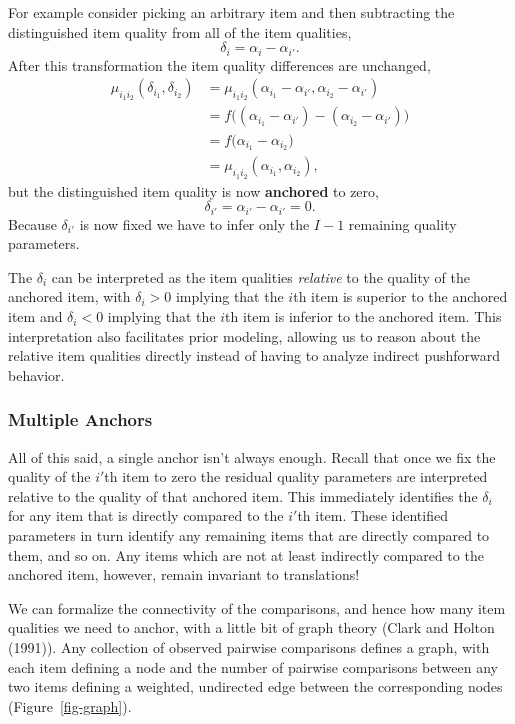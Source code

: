 \documentclass[
  letterpaper,
  DIV=11,
  numbers=noendperiod]{scrartcl}
\begin{document}
For example consider picking an arbitrary item and then subtracting the
distinguished item quality from all of the item qualities, \[
\delta_{i} = \alpha_{i} - \alpha_{i'}.
\] After this transformation the item quality differences are unchanged,
\begin{align*}
\mu_{i_{1} i_{2}}( \delta_{i_{1}}, \delta_{i_{2}} )
&=
\mu_{i_{1} i_{2}}( \alpha_{i_{1}} - \alpha_{i'},
                   \alpha_{i_{2}} - \alpha_{i'} )
\\
&=
f \big(  (\alpha_{i_{1}} - \alpha_{i'})
       - (\alpha_{i_{2}} - \alpha_{i'}) \big)
\\
&=
f \big( \alpha_{i_{1}} - \alpha_{i_{2}} \big)
\\
&=
\mu_{i_{1} i_{2}}( \alpha_{i_{1}}, \alpha_{i_{2}} ),
\end{align*} but the distinguished item quality is now \textbf{anchored}
to zero, \[
\delta_{i'} = \alpha_{i'} - \alpha_{i'} = 0.
\] Because \(\delta_{i'}\) is now fixed we have to infer only the
\(I - 1\) remaining quality parameters.

The \(\delta_{i}\) can be interpreted as the item qualities
\emph{relative} to the quality of the anchored item, with
\(\delta_{i} > 0\) implying that the \(i\)th item is superior to the
anchored item and \(\delta_{i} < 0\) implying that the \(i\)th item is
inferior to the anchored item. This interpretation also facilitates
prior modeling, allowing us to reason about the relative item qualities
directly instead of having to analyze indirect pushforward behavior.

\subsubsection{Multiple Anchors}\label{multiple-anchors}

All of this said, a single anchor isn't always enough. Recall that once
we fix the quality of the \(i'\)th item to zero the residual quality
parameters are interpreted relative to the quality of that anchored
item. This immediately identifies the \(\delta_{i}\) for any item that
is directly compared to the \(i'\)th item. These identified parameters
in turn identify any remaining items that are directly compared to them,
and so on. Any items which are not at least indirectly compared to the
anchored item, however, remain invariant to translations!

We can formalize the connectivity of the comparisons, and hence how many
item qualities we need to anchor, with a little bit of graph theory
(Clark and Holton (1991)). Any collection of observed pairwise
comparisons defines a graph, with each item defining a node and the
number of pairwise comparisons between any two items defining a
weighted, undirected edge between the corresponding nodes
(Figure~\ref{fig-graph}).
\end{document}
